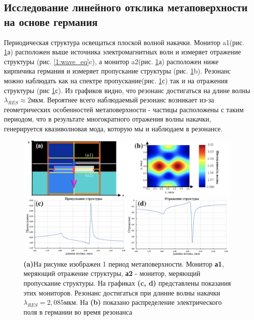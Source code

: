 \subsection{Исследование линейного отклика метаповерхности на основе германия}
\hspace{2mm}
Периодическая структура освещаться плоской волной накачки. Монитор a1(рис.  \ref{base2}а) расположен выше источника электромагнитных волн и измеряет отражение структуры (рис. \ref{1:wave_eq}c), а монитор a2(рис. \ref{base2}а) расположен ниже кирпичика германия и измеряет пропускание структуры (рис. \ref{base2}b). Резонанс можно наблюдать как на спектре пропускание(рис. \ref{base2}с) так и на отражения структуры (рис \ref{base2}с).  Из графиков видно, что резонанс достигаться на длине волны  $\lambda_{RES} \approx 2$мкм. 
\hspace{2mm}
 Вероятнее всего наблюдаемый резонанс возникает из-за геометрических особенностей метаповерхности - частицы расположены с таким периодом, что в результате многократного отражения волны накачки, генерируется квазиволновая мода, которую мы и наблюдаем в резонансе.
\begin{figure}[h]
	\centering
    \includegraphics[width=0.9\linewidth]{images/expert.png}
	\caption{\textbf{(a)}На рисунке изображен 1 период метаповерхности. Монитор \textbf{а1}, меряющий отражение структуры, \textbf{а2} - монитор, меряющий пропускание структуры. На графиках \textbf{ (c, d)} представлены показания этих мониторов. Резонанс достигаться при длинне волны накачки $\lambda_{RES} = 2,085$мкм. На \textbf{(b)} показано распределение электрического поля в германии во время резонанса}
	\label{base2}
\end{figure}


